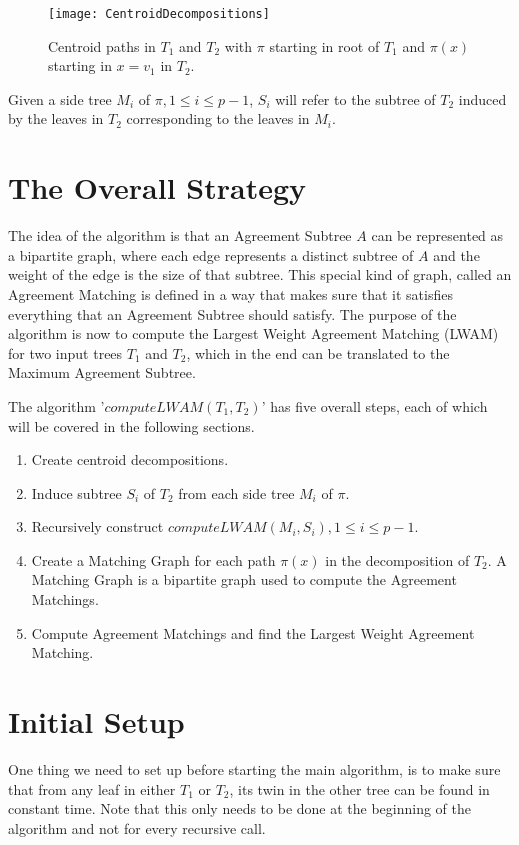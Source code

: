 \begin{figure}
	\label{centroidFigure}
	\texttt{[image: CentroidDecompositions]}
	\caption{Centroid paths in $T_1$ and $T_2$ with $\pi$ starting in root of $T_1$ and $\pi(x)$ starting in $x = v_1$ in $T_2$. \cite{nlogn}}
\end{figure}

Given a side tree $M_i$ of $\pi, 1 \le i \le p-1$, $S_i$ will refer to the subtree of $T_2$ induced by the leaves in $T_2$ corresponding to the leaves in $M_i$.

\section{The Overall Strategy}
The idea of the algorithm is that an Agreement Subtree $A$ can be represented as a bipartite graph, where each edge represents a distinct subtree of $A$ and the weight of the edge is the size of that subtree. This special kind of graph, called an Agreement Matching is defined in a way that makes sure that it satisfies everything that an Agreement Subtree should satisfy. The purpose of the algorithm is now to compute the Largest Weight Agreement Matching (LWAM) for two input trees $T_1$ and $T_2$, which in the end can be translated to the Maximum Agreement Subtree.

The algorithm '$computeLWAM(T_1,T_2)$' has five overall steps, each of which will be covered in the following sections.

\begin{enumerate}
	\item Create centroid decompositions.
	\item Induce subtree $S_i$ of $T_2$ from each side tree $M_i$ of $\pi$.
	\item Recursively construct $computeLWAM(M_i, S_i), 1 \le i \le p-1$.
	\item Create a Matching Graph for each path $\pi(x)$ in the decomposition of $T_2$.
		\subitem A Matching Graph is a bipartite graph used to compute the Agreement Matchings.
	\item Compute Agreement Matchings and find the Largest Weight Agreement Matching.
\end{enumerate}

\section{Initial Setup}
One thing we need to set up before starting the main algorithm, is to make sure that from any leaf in either $T_1$ or $T_2$, its twin in the other tree can be found in constant time. Note that this only needs to be done at the beginning of the algorithm and not for every recursive call.

